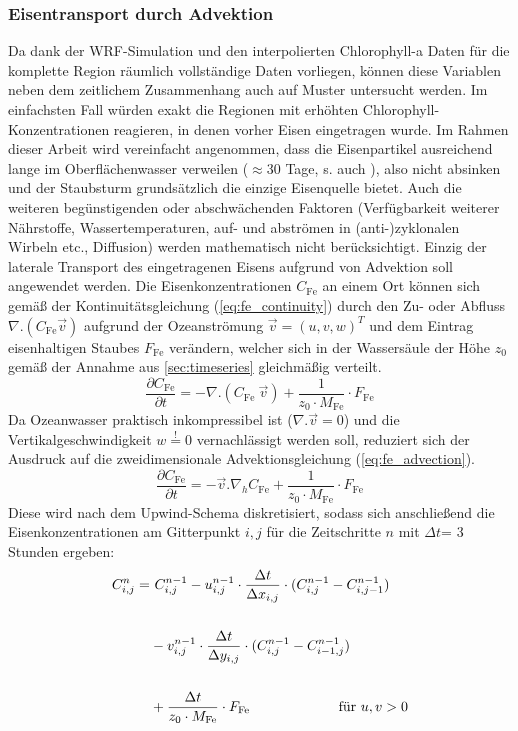 \documentclass[12pt,a4paper,onecolumn]{scrartcl}
\begin{document}
\subsubsection{Eisentransport durch Advektion} \label{sec:methods_advection}
Da dank der WRF-Simulation und den interpolierten Chlorophyll-a Daten \citep{Saulquin.2019} für die komplette Region räumlich vollständige Daten vorliegen, können diese Variablen neben dem zeitlichem Zusammenhang auch auf Muster untersucht werden. Im einfachsten Fall würden exakt die Regionen mit erhöhten Chlorophyll-Konzentrationen reagieren, in denen vorher Eisen eingetragen wurde. Im Rahmen dieser Arbeit wird vereinfacht angenommen, dass die Eisenpartikel ausreichend lange im Oberflächenwasser verweilen ($\approx$30 Tage, s. auch \citet{Cropp.2013}), also nicht absinken und der Staubsturm grundsätzlich die einzige Eisenquelle bietet. Auch die weiteren begünstigenden oder abschwächenden Faktoren (Verfügbarkeit weiterer Nährstoffe, Wassertemperaturen, auf- und abströmen in (anti-)zyklonalen Wirbeln etc., Diffusion) werden mathematisch nicht berücksichtigt. Einzig der laterale Transport des eingetragenen Eisens aufgrund von Advektion soll angewendet werden. Die Eisenkonzentrationen $C_\text{Fe}$ an einem Ort können sich gemäß der Kontinuitätsgleichung (\ref{eq:fe_continuity}) durch den Zu- oder Abfluss $\nabla . (C_\text{Fe} \vec{v})$ aufgrund der Ozeanströmung $\vec{v} = (u,v,w)^T$  und dem Eintrag eisenhaltigen Staubes $F_\text{Fe}$ verändern, welcher sich in der Wassersäule der Höhe $z_0$ gemäß der Annahme aus \ref{sec:timeseries} gleichmäßig verteilt.
\begin{equation}
\frac{\partial C_\text{Fe}}{\partial t} = - \nabla . (C_\text{Fe} \ \vec{v}) + \frac{1}{z_0 \cdot M_\text{Fe}} \cdot F_\text{Fe} \label{eq:fe_continuity}
\end{equation}
Da Ozeanwasser praktisch inkompressibel ist ($\nabla . \vec{v}=0$) und die Vertikalgeschwindigkeit $w\overset{!}{=}0$ vernachlässigt werden soll, reduziert sich der Ausdruck auf die zweidimensionale Advektionsgleichung (\ref{eq:fe_advection}).
\begin{equation}
\frac{\partial C_\text{Fe}}{\partial t} = - \vec{v} . \nabla_h  C_\text{Fe}  + \frac{1}{z_0 \cdot M_\text{Fe}} \cdot F_\text{Fe} \label{eq:fe_advection}
\end{equation}
Diese wird nach dem Upwind-Schema diskretisiert, sodass sich anschließend die Eisenkonzentrationen am Gitterpunkt $i,j$ für die Zeitschritte $n$ mit $\Delta t$= 3 Stunden ergeben:
\begin{equation}
\begin{split}
C_{i,j}^n = &\ C_{i,j}^{n-1} - u_{i,j}^{n-1} \cdot \frac{\Delta t}{\Delta x_{i,j}} \cdot (C_{i,j}^{n-1} - C_{i,j-1}^{n-1}) \\\\
&- v_{i,j}^{n-1} \cdot \frac{\Delta t}{\Delta y_{i,j}} \cdot (C_{i,j}^{n-1} - C_{i-1,j}^{n-1})  \\\\
&+ \frac{\Delta t}{z_0 \cdot M_\text{Fe}} \cdot F_\text{Fe} \text{ \qquad  \qquad \qquad für } u,v > 0
\end{split}
\end{equation}
\end{document}
